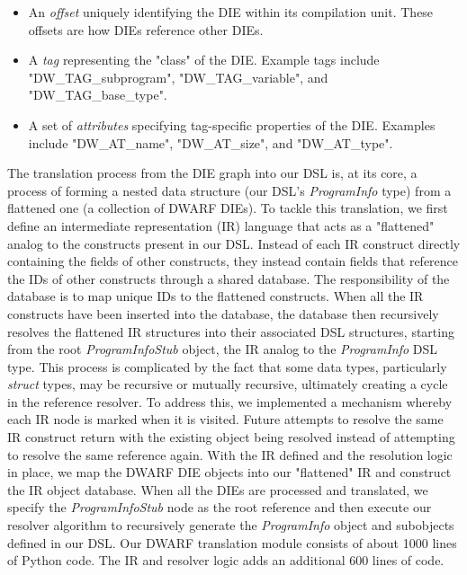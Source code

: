 \begin{itemize}
    \item An \emph{offset} uniquely identifying the DIE within its compilation unit. These offsets are how DIEs reference other DIEs.
    \item A \emph{tag} representing the "class" of the DIE. Example tags include "DW\_TAG\_subprogram", "DW\_TAG\_variable", and "DW\_TAG\_base\_type".
    \item A set of \emph{attributes} specifying tag-specific properties of the DIE. Examples include "DW\_AT\_name", "DW\_AT\_size", and "DW\_AT\_type".
\end{itemize}

The translation process from the DIE graph into our DSL is, at its core, a process of forming a nested data structure (our DSL's \emph{ProgramInfo} type) from a flattened one (a collection of DWARF DIEs). To tackle this translation, we first define an intermediate representation (IR) language that acts as a "flattened" analog to the constructs present in our DSL. Instead of each IR construct directly containing the fields of other constructs, they instead contain fields that reference the IDs of other constructs through a shared database. The responsibility of the database is to map unique IDs to the flattened constructs. When all the IR constructs have been inserted into the database, the database then recursively resolves the flattened IR structures into their associated DSL structures, starting from the root \emph{ProgramInfoStub} object, the IR analog to the \emph{ProgramInfo} DSL type. This process is complicated by the fact that some data types, particularly \emph{struct} types, may be recursive or mutually recursive, ultimately creating a cycle in the reference resolver. To address this, we implemented a mechanism whereby each IR node is marked when it is visited. Future attempts to resolve the same IR construct return with the existing object being resolved instead of attempting to resolve the same reference again. With the IR defined and the resolution logic in place, we map the DWARF DIE objects into our "flattened" IR and construct the IR object database. When all the DIEs are processed and translated, we specify the \emph{ProgramInfoStub} node as the root reference and then execute our resolver algorithm to recursively generate the \emph{ProgramInfo} object and subobjects defined in our DSL. Our DWARF translation module consists of about 1000 lines of Python code. The IR and resolver logic adds an additional 600 lines of code.

